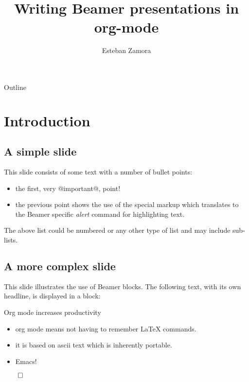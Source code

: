 \documentclass[bigger]{beamer}
\author{Esteban Zamora}
\date{}
\title{Writing Beamer presentations in org-mode}
\begin{document}
\maketitle
\begin{frame}{Outline}
\tableofcontents
\end{frame}



\section{Introduction}
\label{sec:org72b4500}
\subsection{A simple slide}
\label{sec:orge2fdfe1}
This slide consists of some text with a number of bullet points:

\begin{itemize}
\item the first, very @important@, point!
\item the previous point shows the use of the special markup which
translates to the Beamer specific \emph{alert} command for highlighting
text.
\end{itemize}


The above list could be numbered or any other type of list and may
include sub-lists.

\subsection{A more complex slide}
\label{sec:orgcc0652b}
This slide illustrates the use of Beamer blocks.  The following text,
with its own headline, is displayed in a block:
\begin{frame}[label={sec:orgf0409fe}]{Org mode increases productivity}
\begin{itemize}
\item org mode means not having to remember \LaTeX{} commands.
\item it is based on ascii text which is inherently portable.
\item Emacs!
\end{itemize}

\hfill \(\qed\)
\end{frame}
\end{document}
